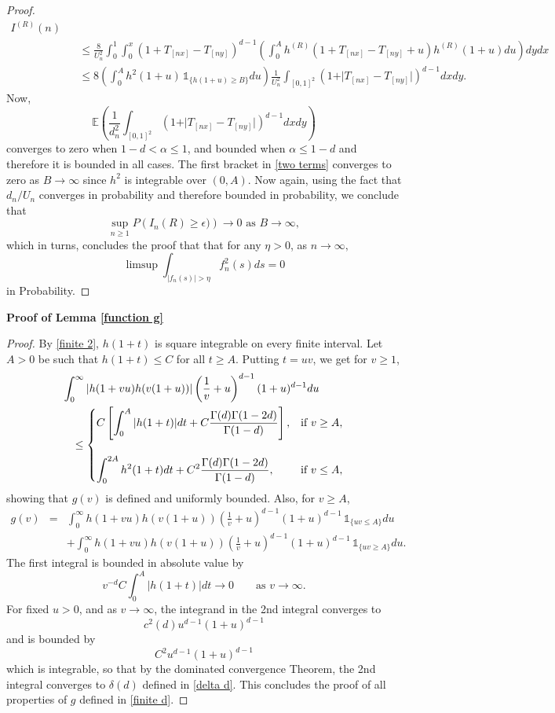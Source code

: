 \documentclass[preprint,12pt]{article}
\newcommand{\ind}[1]{\,\mathds{1}_{\{#1\}}}
\begin{document}
\begin{proof}
\begin{eqnarray}
{I^{(R)}(n)}\nonumber\\
&&\le\frac{8}{U_n^2}\int_0^1\int_0^x(1+T_{[nx]}-T_{[ny]})^{d-1}
\left(\int_0^Ah^{(R)}(1+T_{[nx]}-T_{[ny]}+u)h^{(R)}(1+u)du\right)dydx\nonumber\\
&&\le8\left(\int_0^Ah^2(1+u)\ind{h(1+u)\ge B}du\right)\frac{1}{U_n^2}\int_{[0,1]^2}(1+\vert T_{[nx]}-T_{[ny]}\vert)^{d-1}dxdy.
\end{eqnarray}
Now,
$$
\mathbb{E}\left(\frac{1}{d_n^2}\int_{[0,1]^2}(1+\vert T_{[nx]}-T_{[ny]}\vert)^{d-1}dxdy\right)
$$
converges to zero when $1-d<\alpha\le1$, and bounded when $\alpha\le1-d$ and therefore it is bounded in all cases. The first bracket in \eqref{two terms} converges to zero as $B\to\infty$ since $h^2$ is integrable over $(0,A)$. Now again, using the fact that $d_n/U_n$ converges in probability and therefore bounded in probability, we conclude that  
$$
\underset{n\ge1}{\sup}P\left(I_n(R)\ge\epsilon)\right)\to0\textrm{ as  }B\to\infty,
$$
which in turns, concludes the proof that  that for any $\eta>0$, as $n\to\infty,$
$$
\limsup\int_{\vert f_n(s)\vert>\eta}f^2_n(s)ds=0
$$
in Probability.
\end{proof}\noindent
{\bf Proof of Lemma \ref{function g}}\label{proof of Tech lemma}
\begin{proof}
By \eqref{finite 2}, $h(1+t)$ is square integrable on every finite interval. Let $A>0$ be such that $h(1+t)\le C$ for all $t\ge A$. Putting $t=uv$, we get for $v\ge1$,
\begin{eqnarray*}\lefteqn{
\int_0^\infty \vert h(1+vu)h(v(1+u))\vert\left(\frac{1}{v}+u\right)^{d-1}(1+u)^{d-1}du
}\\
   &&\le\begin{cases}
       C\left[\displaystyle\int_0^A\vert h(1+t)\vert dt+C\frac{\Gamma(d)\Gamma(1-2d)}{\Gamma(1-d)}\right],&\textrm{if }v\ge A,\\\\
\displaystyle\int_0^{2A}h^2(1+t)dt+C^2\frac{\Gamma(d)\Gamma(1-2d)}{\Gamma(1-d)},&\textrm{if }v\le A,
   \end{cases}
\end{eqnarray*}
showing that $g(v)$ is defined and  uniformly bounded. Also, for $v\ge A$,
\begin{eqnarray*}
g(v)&=&\int_0^\infty h(1+vu)h(v(1+u))\left(\frac{1}{v}+u\right)^{d-1}(1+u)^{d-1}\ind{uv\le A}du\\
&&+\int_0^\infty  h(1+vu)h(v(1+u))\left(\frac{1}{v}+u\right)^{d-1}(1+u)^{d-1}\ind{uv\ge A}du.
\end{eqnarray*}
The first integral is bounded in absolute value by
$$
v^{-d}C\int_0^A \vert h(1+t)\vert dt\to0\qquad\textrm{as }v\to\infty.
$$
For fixed $u>0$, and as $v\to\infty$,  the integrand in the 2nd integral converges to 
$$
c^2(d)u^{d-1}(1+u)^{d-1}
$$
and is bounded by
$$
C^2u^{d-1}(1+u)^{d-1}
$$
which is integrable, 
so that by the dominated convergence Theorem, the 2nd integral converges to $\delta(d)$ defined in \eqref{delta d}. This concludes  the proof of all properties of $g$ defined in \eqref{finite d}.
\end{proof}


\end{document}
